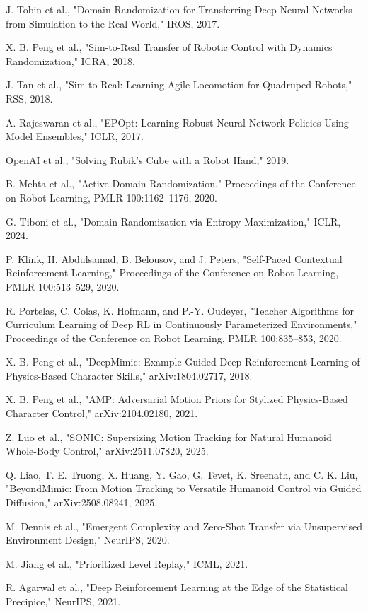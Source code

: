 \documentclass[letterpaper,10pt,conference]{ieeeconf}
\begin{document}
\noindent [1] J. Tobin et al., "Domain Randomization for Transferring Deep Neural Networks from Simulation to the Real World," IROS, 2017.\par\medskip
\noindent [2] X. B. Peng et al., "Sim-to-Real Transfer of Robotic Control with Dynamics Randomization," ICRA, 2018.\par\medskip
\noindent [3] J. Tan et al., "Sim-to-Real: Learning Agile Locomotion for Quadruped Robots," RSS, 2018.\par\medskip
\noindent [4] A. Rajeswaran et al., "EPOpt: Learning Robust Neural Network Policies Using Model Ensembles," ICLR, 2017.\par\medskip
\noindent [5] OpenAI et al., "Solving Rubik's Cube with a Robot Hand," 2019.\par\medskip
\noindent [6] B. Mehta et al., "Active Domain Randomization," Proceedings of the Conference on Robot Learning, PMLR 100:1162--1176, 2020.\par\medskip
\noindent [7] G. Tiboni et al., "Domain Randomization via Entropy Maximization," ICLR, 2024.\par\medskip
\noindent [8] P. Klink, H. Abdulsamad, B. Belousov, and J. Peters, "Self-Paced Contextual Reinforcement Learning," Proceedings of the Conference on Robot Learning, PMLR 100:513--529, 2020.\par\medskip
\noindent [9] R. Portelas, C. Colas, K. Hofmann, and P.-Y. Oudeyer, "Teacher Algorithms for Curriculum Learning of Deep RL in Continuously Parameterized Environments," Proceedings of the Conference on Robot Learning, PMLR 100:835--853, 2020.\par\medskip
\noindent [10] X. B. Peng et al., "DeepMimic: Example-Guided Deep Reinforcement Learning of Physics-Based Character Skills," arXiv:1804.02717, 2018.\par\medskip
\noindent [11] X. B. Peng et al., "AMP: Adversarial Motion Priors for Stylized Physics-Based Character Control," arXiv:2104.02180, 2021.\par\medskip
\noindent [12] Z. Luo et al., "SONIC: Supersizing Motion Tracking for Natural Humanoid Whole-Body Control," arXiv:2511.07820, 2025.\par\medskip
\noindent [13] Q. Liao, T. E. Truong, X. Huang, Y. Gao, G. Tevet, K. Sreenath, and C. K. Liu, "BeyondMimic: From Motion Tracking to Versatile Humanoid Control via Guided Diffusion," arXiv:2508.08241, 2025.\par\medskip
\noindent [14] M. Dennis et al., "Emergent Complexity and Zero-Shot Transfer via Unsupervised Environment Design," NeurIPS, 2020.\par\medskip
\noindent [15] M. Jiang et al., "Prioritized Level Replay," ICML, 2021.\par\medskip
\noindent [16] R. Agarwal et al., "Deep Reinforcement Learning at the Edge of the Statistical Precipice," NeurIPS, 2021.\par\medskip
\end{document}
